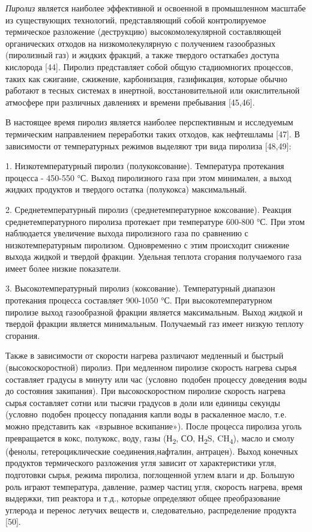 \begin{multicols}{2}
\emph{Пиролиз} является наиболее эффективной и освоенной в промышленном
масштабе из существующих технологий, представляющий собой контролируемое
термическое разло­жение (деструкцию) высокомолекулярной составляющей
органических отходов на низкомолекулярную с получе­нием газообразных
(пиролизный газ) и жидких фракций, а также твердого остаткабез доступа
кислорода {[}44{]}. Пиролиз представляет собой общую стадиюмногих
процессов, таких как сжигание, сжижение, карбонизация, газификация,
которые обычно работают в тесных системах в инертной, восстановительной
или окислительной атмосфере при различных давлениях и времени пребывания
{[}45,46{]}.

В настоящее время пиролиз является наиболее перспективным и исследуемым
термическим направлением переработки таких отходов, как нефтешламы
{[}47{]}. В зависимости от температурных режимов выделяют три вида
пиролиза {[}48,49{]}:

1. Низкотемпературный пиролиз (полукоксование). Температура протекания
процесса - 450-550 °С. Выход пиролизного газа при этом минимален, а
выход жидких продуктов и твердого остатка (полукокса) максимальный.

2. Среднетемпературный пиролиз (среднетемпе­ратурное коксование). Реакция
среднетемпературного пиролиза протекает при температуре 600-800 °С. При
этом наблюдается увеличение выхода пиролизного газа по сравнению с
низкотемпературным пиролизом. Одновременно с этим происходит снижение
выхода жид­кой и твердой фракции. Удельная теплота сгорания получаемого
газа имеет более низкие показатели.

3. Высокотемпературный пиролиз (коксование). Температурный диапазон
протекания процесса состав­ляет 900-1050 °С. При высокотемпературном
пиролизе выход газообразной фракции является максимальным. Выход жидкой
и твердой фракции является минималь­ным. Получаемый газ имеет низкую
теплоту сгорания.

Также в зависимости от скорости нагрева различают медленный и быстрый
(высокоскоростной) пиролиз. При медленном пиролизе скорость нагрева
сырья составляет градусы в минуту или час (условно~подобен процессу
доведения воды до состояния закипания). При высокоскоростном пиролизе
скорость нагрева сырья составляет сотни или тысячи градусов в доли или
единицы секунды (условно~подобен процессу попадания капли воды в
раскаленное масло, т.е. можно представить как~«взрывное вскипание»).
После процесса пиролиза уголь превращается в кокс, полукокс, воду, газы
(Н\textsubscript{2}, СО, Н\textsubscript{2}S, CH\textsubscript{4}),
масло и смолу (фенолы, гетероциклические соединения,нафталин, антрацен).
Выход конечных продуктов термического разложения угля зависит от
характеристики угля, подготовки сырья, режима пиролиза, поглощенной
углем влаги и др. Большую роль играют температура, давление, размер
частиц угля, скорость нагрева, время выдержки, тип реактора и т.д.,
которые определяют общее преобразование углерода и перенос летучих
веществ и, следовательно, распределение продукта {[}50{]}.


\end{multicols}
